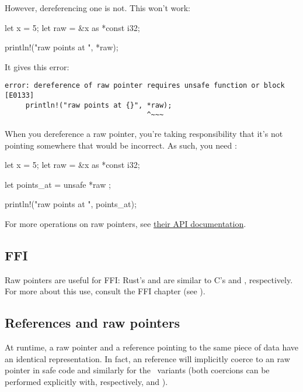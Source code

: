 However, dereferencing one is not. This won't work:

\begin{rustc}
let x = 5;
let raw = &x as *const i32;

println!("raw points at {}", *raw);
\end{rustc}

It gives this error:

\begin{verbatim}
error: dereference of raw pointer requires unsafe function or block [E0133]
     println!("raw points at {}", *raw);
                                  ^~~~
\end{verbatim}

When you dereference a raw pointer, you're taking responsibility that it's not pointing somewhere that would be incorrect. 
As such, you need :

\begin{rustc}
let x = 5;
let raw = &x as *const i32;

let points_at = unsafe { *raw };

println!("raw points at {}", points_at);
\end{rustc}

For more operations on raw pointers, see \href{https://doc.rust-lang.org/std/primitive.pointer.html}{their API documentation}.

\subsection*{FFI}

Raw pointers are useful for FFI: Rust's  and  are similar to C's  and , respectively. 
For more about this use, consult the FFI chapter (see ).

\subsection*{References and raw pointers}

At runtime, a raw pointer \code{*} and a reference pointing to the same piece of data have an identical representation. In fact, an 
 reference will implicitly coerce to an  raw pointer in safe code and similarly for the \mut\ variants (both 
coercions can be performed explicitly with, respectively,  and ).

\blank

